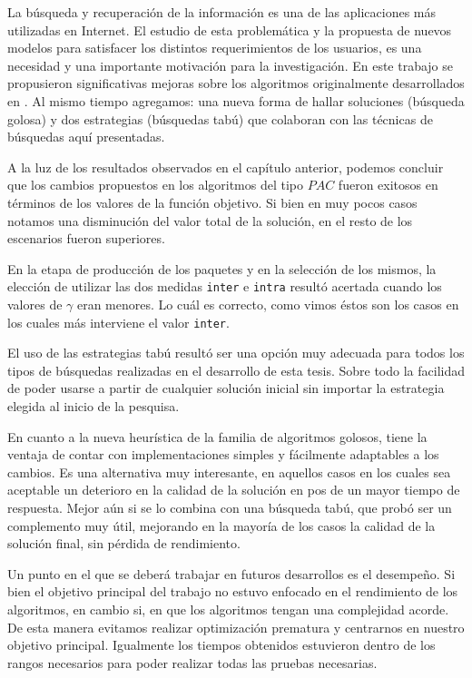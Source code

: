 La búsqueda y recuperación de la información es una de las aplicaciones más utilizadas en Internet. El estudio de esta problemática y la propuesta de nuevos modelos para satisfacer los distintos requerimientos de los usuarios, es una necesidad y una importante motivación para la investigación. En este trabajo se propusieron significativas mejoras sobre los algoritmos originalmente desarrollados en \cite{journals/tkde/Amer-YahiaBCFMZ14}. Al mismo tiempo agregamos: una nueva forma de hallar soluciones (búsqueda golosa) y dos estrategias (búsquedas tabú) que colaboran con las técnicas de búsquedas aquí presentadas.

A la luz de los resultados observados en el capítulo anterior, podemos concluir que los cambios propuestos en los algoritmos del tipo $PAC$ fueron exitosos en términos de los valores de la función objetivo. Si bien en muy pocos casos notamos una disminución del valor total de la solución, en el resto de los escenarios fueron superiores. 

En la etapa de producción de los paquetes y en la selección de los mismos, la elección de utilizar las dos medidas \texttt{inter} e \texttt{intra} resultó acertada cuando los valores de $\gamma$ eran menores. Lo cuál es correcto, como vimos éstos son los casos en los cuales más interviene el valor \texttt{inter}.

El uso de las estrategias tabú resultó ser una opción muy adecuada para todos los tipos de búsquedas realizadas en el desarrollo de esta tesis. Sobre todo la facilidad de poder usarse a partir de cualquier solución inicial sin importar la estrategia elegida al inicio de la pesquisa.

En cuanto a la nueva heurística de la familia de algoritmos golosos, tiene la ventaja de contar con implementaciones simples y fácilmente adaptables a los cambios. Es una alternativa muy interesante, en aquellos casos en los cuales sea aceptable un deterioro en la calidad de la solución en pos de un mayor tiempo de respuesta. Mejor aún si se lo combina con una búsqueda tabú, que probó ser un complemento muy útil, mejorando en la mayoría de los casos la calidad de la solución final, sin pérdida de rendimiento. 

Un punto en el que se deberá trabajar en futuros desarrollos es el desempeño. Si bien el objetivo principal del trabajo no estuvo enfocado en el rendimiento de los algoritmos, en cambio si, en que los algoritmos tengan una complejidad acorde. De esta manera evitamos realizar optimización prematura y centrarnos en nuestro objetivo principal. Igualmente los tiempos obtenidos estuvieron dentro de los rangos necesarios para poder realizar todas las pruebas necesarias.

